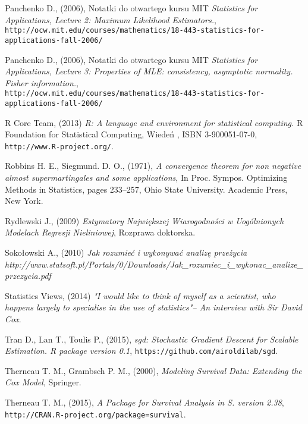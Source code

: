 \begin{thebibliography}{99}
 Panchenko D., (2006), Notatki do otwartego kursu MIT \textit{Statistics for Applications, Lecture 2: Maximum Likelihood Estimators.}, \\
\texttt{http://ocw.mit.edu/courses/mathematics/18-443-statistics-for-applications-fall-2006/}



 Panchenko D., (2006), Notatki do otwartego kursu MIT \textit{Statistics for Applications, Lecture 3: Properties of MLE: consistency, asymptotic normality. Fisher information.}, \\
\texttt{http://ocw.mit.edu/courses/mathematics/18-443-statistics-for-applications-fall-2006/}



 R Core Team, (2013) \textit{R: A language and environment for statistical computing.} R Foundation for Statistical Computing, Wiedeń , ISBN 3-900051-07-0, \texttt{http://www.R-project.org/}.


 Robbins H. E., Siegmund. D. O., (1971), \textit{A convergence theorem for non negative almost supermartingales
and some applications}, In Proc. Sympos. Optimizing
Methods in Statistics, pages 233–257, Ohio State
University. Academic Press, New York.

 Rydlewski J., (2009) \textit{Estymatory Największej Wiarogodności w Uogólnionych Modelach Regresji Nieliniowej}, Rozprawa doktorska.

 Sokołowski A., (2010) \textit{Jak rozumieć i wykonywać analizę przeżycia} \textit{http://www.statsoft.pl/Portals/0/Downloads/Jak\_rozumiec\_i\_wykonac\_analize\_przezycia.pdf}

 Statistics Views, (2014) \textit{ "I would like to think of myself as a scientist, who happens largely to specialise in the use of statistics"– An interview with Sir David Cox}. 

 Tran D., Lan T., Toulis P., (2015), \textit{sgd: Stochastic Gradient Descent for Scalable Estimation. R package version 0.1}, \texttt{https://github.com/airoldilab/sgd}.

 Therneau T. M., Grambsch P. M., (2000), \textit{Modeling Survival Data: Extending the Cox Model}, Springer.

 Therneau T. M., (2015), \textit{A Package for Survival Analysis in S. version 2.38}, \texttt{http://CRAN.R-project.org/package=survival}.



\end{thebibliography}
